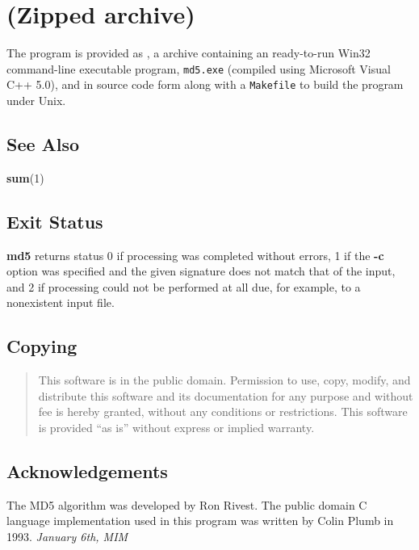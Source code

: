 \section{
 (Zipped
archive)}

The program is provided as
, a
 archive containing an ready-to-run
Win32 command-line executable program, {\tt md5.exe} (compiled using Microsoft
Visual C++ 5.0), and in source code form along with a {\tt Makefile} to build
the program under Unix.

\subsection{See Also}

{\bf sum}(1)

\subsection{Exit Status}

{\bf md5} returns status 0 if processing was completed without errors, 1 if
the {\bf -c} option was specified and the given signature does not match that
of the input, and 2 if processing could not be performed at all due, for
example, to a nonexistent input file.

\subsection{Copying}

\begin{quote}
This software is in the public domain. Permission to use, copy,  modify, and
distribute this software and its documentation for any purpose and  without
fee is hereby granted, without any conditions or restrictions. This  software
is provided ``as is'' without express or implied warranty.
\end{quote}

\subsection{Acknowledgements}

The MD5 algorithm was developed by Ron Rivest. The public domain C language
implementation used in this program was written by Colin Plumb in 1993.
{\it
{}
January 6th, MIM }
